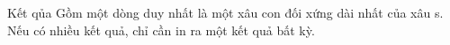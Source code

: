 Kết qủa
Gồm một dòng duy nhất là một xâu con đối xứng dài nhất của xâu s. Nếu có nhiều kết quả, chỉ cần in ra một kết quả bất kỳ.